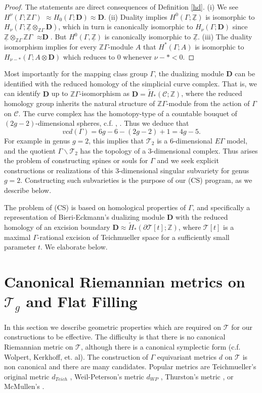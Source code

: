 \documentclass[12pt]{amsart}
\theoremstyle{definition}
\theoremstyle{remark}
\newcommand{\bZ}{\mathbb{Z}}
\newcommand{\del}{\partial}
\newcommand{\bD}{\textbf{D}}
\newcommand{\sC}{\mathscr{C}}
\newcommand{\sT}{\mathscr{T}}
\begin{document}
\begin{proof} 
The statements are direct consequences of Definition \ref{hd}. (i) We see $H^\nu(\Gamma; \bZ \Gamma)$ $\approx H_0(\Gamma; \bD)\approx \textbf{D}$. (ii) Duality implies $H^0(\Gamma; \underline{\bZ} )$ is isomorphic to $H_\nu(\Gamma; \underline{\bZ} \otimes_{\bZ \Gamma} \bD)$, which in turn is canonically isomorphic to $H_\nu(\Gamma; \bD)$ since $\underline{\bZ}\otimes_{\bZ \Gamma} \bZ \Gamma$ $\approx \bD$. But $H^0(\Gamma, \underline{\bZ})$ is canonically isomorphic to $\underline{\bZ}$. (iii) The duality isomorphism implies for every $\bZ \Gamma$-module $A$ that $H^*(\Gamma; A)$ is isomorphic to $H_{\nu-*}(\Gamma; A \otimes \bD)$ which reduces to $0$ whenever $\nu-*<0$.
\end{proof}

Most importantly for the mapping class group $\Gamma$, the dualizing module $\bD$ can be identified with the reduced homology of the simplicial curve complex. That is, we can identify $\bD$ up to $\bZ\Gamma$-isomorphism as $\bD=\tilde{H}_*(\sC;\bZ)$, where the reduced homology group inherits the natural structure of $\bZ \Gamma$-module from the action of $\Gamma$ on $\sC$. The curve complex has the homotopy-type of a countable bouquet of $(2g-2)$-dimensional spheres, c.f. \cite{ivanov2015virtual}, \cite{Harer1986}. Thus we deduce that $$vcd(\Gamma)=6g-6-(2g-2)+1=4g-5.$$ For example in genus $g=2$, this implies that $\sT_2$ is a $6$-dimensional $E\Gamma$ model, and the quotient $\Gamma \backslash \sT_2$ has the topology of a $3$-dimensional complex. Thus arises the problem of constructing spines or souls for $\Gamma$ and we seek explicit constructions or realizations of this $3$-dimensional singular subvariety for genus $g=2$. Constructing such subvarieties is the purpose of our (CS) program, as we describe below.

The problem of (CS) is based on homological properties of $\Gamma$, and specifically a representation of Bieri-Eckmann's dualizing module $\bD$ with the reduced homology of an excision boundary $\bD\approx \tilde{H}_*(\del \sT[t]; \bZ)$, where $\sT[t]$ is a maximal $\Gamma$-rational excision of Teichmueller space for a sufficiently small parameter $t$. We elaborate below.

\section{Canonical Riemannian metrics on $\sT_g$ and Flat Filling}\label{s2}
In this section we describe geometric properties which are required on $\sT$ for our constructions to be effective. The difficulty is that there is no canonical Riemannian metric on $\sT$, although there is a canonical symplectic form (c.f. Wolpert, Kerkhoff, et. al). The construction of $\Gamma$ equivariant metrics $d$ on $\sT$ is non canonical and there are many candidates. Popular metrics are Teichmueller's original metric $d_{Teich}$ \cite{hubbard},  Weil-Peterson's metric $d_{WP}$ \cite{hubbard}, Thurston's metric \cite{wolpert1986a}, or McMullen's \cite{mcmullen2000moduli}. 
\end{document}

